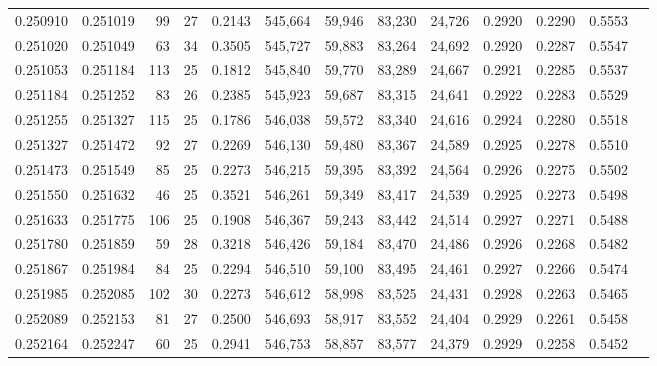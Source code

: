 \begin{tabular}{rrrrrrrrrrrrr}
0.250910 & 0.251019 &  99 &  27 &                                     0.2143 & 545,664 &  59,946 &  83,230 &  24,726 & 0.2920 & 0.2290 & 0.5553 \\
0.251020 & 0.251049 &  63 &  34 &                                     0.3505 & 545,727 &  59,883 &  83,264 &  24,692 & 0.2920 & 0.2287 & 0.5547 \\
0.251053 & 0.251184 & 113 &  25 &                                     0.1812 & 545,840 &  59,770 &  83,289 &  24,667 & 0.2921 & 0.2285 & 0.5537 \\
0.251184 & 0.251252 &  83 &  26 &                                     0.2385 & 545,923 &  59,687 &  83,315 &  24,641 & 0.2922 & 0.2283 & 0.5529 \\
0.251255 & 0.251327 & 115 &  25 &                                     0.1786 & 546,038 &  59,572 &  83,340 &  24,616 & 0.2924 & 0.2280 & 0.5518 \\
0.251327 & 0.251472 &  92 &  27 &                                     0.2269 & 546,130 &  59,480 &  83,367 &  24,589 & 0.2925 & 0.2278 & 0.5510 \\
0.251473 & 0.251549 &  85 &  25 &                                     0.2273 & 546,215 &  59,395 &  83,392 &  24,564 & 0.2926 & 0.2275 & 0.5502 \\
0.251550 & 0.251632 &  46 &  25 &                                     0.3521 & 546,261 &  59,349 &  83,417 &  24,539 & 0.2925 & 0.2273 & 0.5498 \\
0.251633 & 0.251775 & 106 &  25 &                                     0.1908 & 546,367 &  59,243 &  83,442 &  24,514 & 0.2927 & 0.2271 & 0.5488 \\
0.251780 & 0.251859 &  59 &  28 &                                     0.3218 & 546,426 &  59,184 &  83,470 &  24,486 & 0.2926 & 0.2268 & 0.5482 \\
0.251867 & 0.251984 &  84 &  25 &                                     0.2294 & 546,510 &  59,100 &  83,495 &  24,461 & 0.2927 & 0.2266 & 0.5474 \\
0.251985 & 0.252085 & 102 &  30 &                                     0.2273 & 546,612 &  58,998 &  83,525 &  24,431 & 0.2928 & 0.2263 & 0.5465 \\
0.252089 & 0.252153 &  81 &  27 &                                     0.2500 & 546,693 &  58,917 &  83,552 &  24,404 & 0.2929 & 0.2261 & 0.5458 \\
0.252164 & 0.252247 &  60 &  25 &                                     0.2941 & 546,753 &  58,857 &  83,577 &  24,379 & 0.2929 & 0.2258 & 0.5452 \\

\end{tabular}
